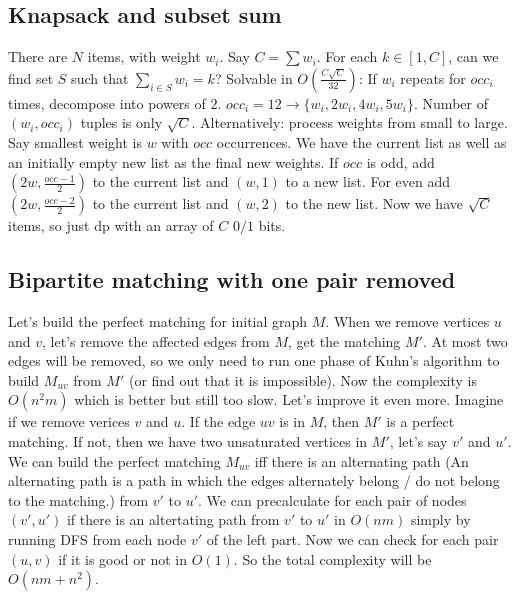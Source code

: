 \subsection{Knapsack and subset sum}
There are $N$ items, with weight $w_i$. Say $C=\sum w_i$. For each $k\in [1,C]$, can we find set $S$ such that $\sum_{i\in S}w_i=k$?
Solvable in $O(\frac{C\sqrt{C}}{32})$: If $w_i$ repeats for $occ_i$ times, decompose into powers of $2$.
$occ_i=12 \to \{w_i, 2w_i, 4w_i, 5w_i\}$. Number of $(w_i, occ_i)$ tuples is only $\sqrt{C}$.
Alternatively: process weights from small to large. Say smallest weight is $w$ with $occ$ occurrences. 
We have the current list as well as an initially empty new list as the final new weights.
If $occ$ is odd, add $(2w, \frac{occ-1}{2})$ to the current list and $(w, 1)$ to a new list. 
For even add $(2w, \frac{occ-2}{2})$ to the current list and $(w, 2)$ to the new list.
Now we have $\sqrt{C}$ items, so just dp with an array of $C$ $0/1$ bits.
\subsection{Bipartite matching with one pair removed}
Let's build the perfect matching for initial graph $M$. When we remove vertices $u$ and $v$, let's remove the
affected edges from $M$, get the matching $M'$. At most two edges will be removed, so we only need to
run one phase of Kuhn's algorithm to build $M_{uv}$ from $M'$ (or find out that it is impossible). Now the
complexity is $O(n^2 m)$ which is better but still too slow. Let's improve it even more.
Imagine if we remove verices $v$ and $u$. If the edge $uv$ is in $M$, then $M'$
is a perfect matching. If not, then we have two unsaturated vertices in $M'$, let's say $v'$ and $u'$. 
We can build the perfect matching $M_{uv}$ iff there is an alternating path 
(An alternating path is a path in which the edges alternately belong / do not belong to the matching.)
from $v'$ to $u'$. 
We can precalculate for each pair of nodes $(v', u')$ if there is an
altertating path from $v'$ to $u'$ in $O(nm)$ simply by running DFS from each node $v'$ of the left part.
Now we can check for each pair $(u, v)$ if it is good or not in $O(1)$. 
So the total complexity will be $O(nm + n^2)$.